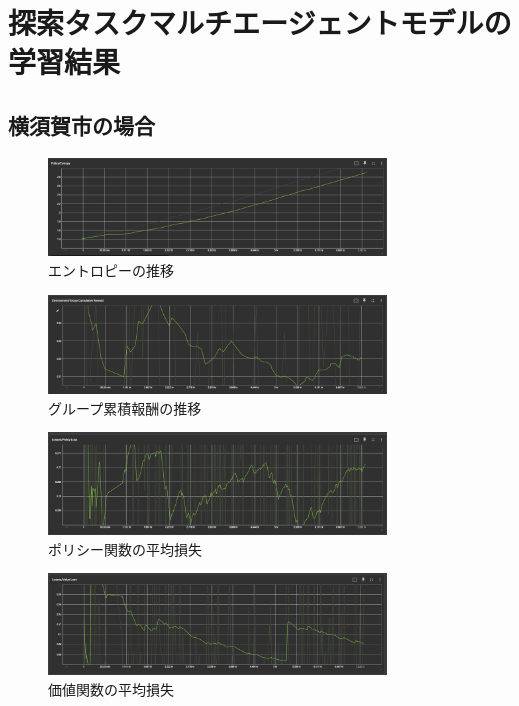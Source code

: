 \appendix

\chapter{探索タスクマルチエージェントモデルの学習結果}
\section{横須賀市の場合}
\begin{figure}[H] 
  \centering 
  \includegraphics[width=0.8\textwidth]{Figures/App-YokosukaSearchEntropy.png}
  \caption{エントロピーの推移} 
  \label{fig:fig-01}
\end{figure}
\begin{figure}[H] 
  \centering 
  \includegraphics[width=0.8\textwidth]{Figures/App-YokosukaSearchGroupRward.png}
  \caption{グループ累積報酬の推移} 
  \label{fig:fig-01}
\end{figure}
\begin{figure}[H] 
  \centering 
  \includegraphics[width=0.8\textwidth]{Figures/YokosukaSearch-PolicyLoss.png}
  \caption{ポリシー関数の平均損失} 
  \label{fig:fig-01}
\end{figure}
\begin{figure}[H] 
  \centering 
  \includegraphics[width=0.8\textwidth]{Figures/App-YokosukaSearchVlueLoss.png}
  \caption{価値関数の平均損失} 
  \label{fig:fig-01}
\end{figure}


